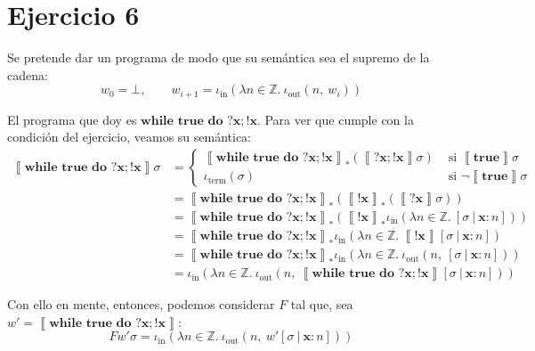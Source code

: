 \documentclass{article}
\newcommand{\sem}[1]{\left\llbracket #1\right\rrbracket}
\newcommand{\Z}{\mathbb{Z}}
\newcommand{\x}{\textbf{x}}
\newcommand{\ctrue}{\textbf{true}}
\newcommand{\cwhile}[2]{\textbf{while }#1\textbf{ do }#2}
\newcommand{\iterm}[1]{\iota_\text{term}\left(#1\right)}
\newcommand{\iout}[2]{\iota_\text{out}\left(#1,\ #2\right)}
\newcommand{\iin}[2]{\iota_\text{in}\left(\lambda #1 \in \Z .\ #2\right)}
\begin{document}
\section*{Ejercicio 6}
Se pretende dar un programa de modo que su semántica sea el supremo de la cadena:
\begin{equation*}
  w_0 = \bot, \qquad w_{i+1} = \iin{n}{\iout{n}{w_i}}
\end{equation*}

El programa que doy es $\cwhile{\ctrue}{?\x; !\x}$.
Para ver que cumple con la condición del ejercicio, veamos su semántica:
\begin{equation*}
  \begin{aligned}
    \sem{\cwhile{\ctrue}{?\x; !\x}}\sigma &= \begin{cases}
                                            \sem{\cwhile{\ctrue}{?\x; !\x}}_* (\sem{?\x; !\x}\sigma) &\text{ si }\sem{\ctrue}\sigma \\ 
                                            \iterm{\sigma} &\text{ si }\neg\sem{\ctrue}\sigma 
                                          \end{cases} \\ 
                                          &= \sem{\cwhile{\ctrue}{?\x; !\x}}_* (\sem{!\x}_* (\sem{?\x}\sigma)) \\ 
                                          &= \sem{\cwhile{\ctrue}{?\x; !\x}}_* (\sem{!\x}_* \iin{n}{[\sigma\ |\ \x : n]}) \\ 
                                          &= \sem{\cwhile{\ctrue}{?\x; !\x}}_* \iin{n}{\sem{!\x}[\sigma\ |\ \x : n]} \\ 
                                          &= \sem{\cwhile{\ctrue}{?\x; !\x}}_* \iin{n}{\iout{n}{[\sigma\ |\ \x : n]}} \\ 
                                          &= \iin{n}{\iout{n}{\sem{\cwhile{\ctrue}{?\x; !\x}}[\sigma\ |\ \x : n]}}
  \end{aligned}
\end{equation*}

Con ello en mente, entonces, podemos considerar $F$ tal que, sea $w' = \sem{\cwhile{\ctrue}{?\x; !\x}}$:
\begin{equation*}
  F w' \sigma = \iin{n}{\iout{n}{w' [\sigma\ |\ \x : n]}}
\end{equation*}
\end{document}
